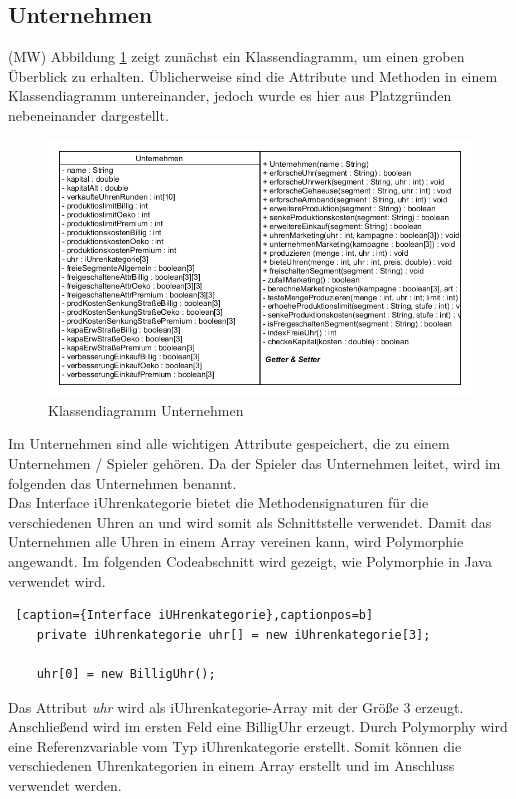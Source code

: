 \newpage
\subsection{Unternehmen}
(MW) Abbildung \ref{fig:abb2} zeigt zunächst ein Klassendiagramm, um einen groben Überblick zu erhalten. Üblicherweise sind die Attribute und Methoden in einem Klassendiagramm untereinander, jedoch wurde es hier aus Platzgründen nebeneinander dargestellt.

\begin{figure} [h]
	\centering
	\includegraphics[scale=0.6]{img/Unternehmen.png} 	
	\caption{Klassendiagramm Unternehmen} \label{fig:abb2}
\end{figure}

Im Unternehmen sind alle wichtigen Attribute gespeichert, die zu einem Unternehmen / Spieler gehören. Da der Spieler das Unternehmen leitet, wird im folgenden das Unternehmen benannt. \\

Das Interface iUhrenkategorie bietet die Methodensignaturen für die verschiedenen Uhren an und wird somit als Schnittstelle verwendet. Damit das Unternehmen alle Uhren in einem Array vereinen kann, wird Polymorphie angewandt. Im folgenden Codeabschnitt wird gezeigt, wie Polymorphie in Java verwendet wird. \\

\lstset{language=Java} 
\begin{lstlisting} [caption={Interface iUHrenkategorie},captionpos=b]
	private iUhrenkategorie uhr[] = new iUhrenkategorie[3];
	
	uhr[0] = new BilligUhr();
\end{lstlisting}

Das Attribut \textit{uhr} wird als iUhrenkategorie-Array mit der Größe 3 erzeugt. Anschließend wird im ersten Feld eine BilligUhr erzeugt. Durch Polymorphy wird eine Referenzvariable vom Typ iUhrenkategorie erstellt. Somit können die verschiedenen Uhrenkategorien in einem Array erstellt und im Anschluss verwendet werden. 

